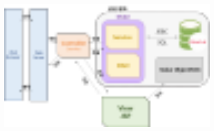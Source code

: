 \begin{figure}[h]
    \begin{center}
        \includegraphics[width=16cm]{./Figure/Model2MVC.pdf}
    \end{center}
\end{figure}
\newpage
